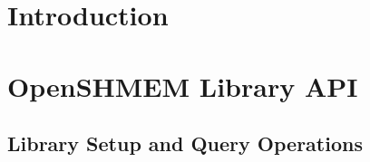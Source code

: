 \documentclass[10pt]{book}
\begin{document}
\hypersetup{pageanchor=true,citecolor=blue}

\pagestyle{fancy}
\fancyhead{}
\fancyhead[LE,LO]{\insertDocVersion}
\fancyfoot[CE,CO]{\thepage}

\setcounter{tocdepth}{3}
\tableofcontents
\mainmatter  %
\pagestyle{headings}  \withlinenumbers
\renewcommand{\thesection}{\arabic{section}} 
{ %
\setlength{\parskip}{3pt} %
\startchap
\section*{Introduction}
\label{sec:intro}
%
%
%

\label{subsec:osh_project}

\label{subsec:programming_model}

\label{subsec:memory_model}

%

\label{subsec:library_constants}

\label{subsec:environment_variables}
\label{subsec:language_bindings}

\clearpage

\startchap
\section{OpenSHMEM Library API}
\label{sec:openshmem_library_api}
\subsection{Library Setup and Query Operations}%

\label{subsec:start_pes}
\label{subsec:shmem_pe_accessible}
\label{subsec:shmem_addr_accessible}
}
\end{document}
